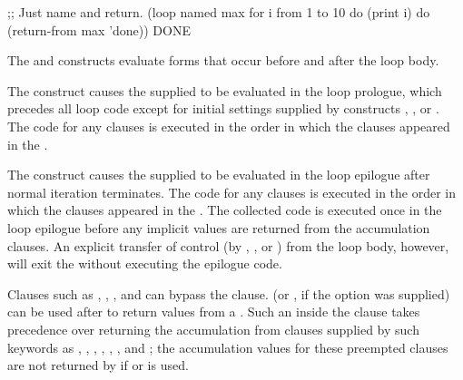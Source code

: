 
\code
;; Just name and return.
 (loop named max
       for i from 1 to 10
       do (print i)
       do (return-from max 'done))
\EV DONE
\endcode

\endsubsubsubsection%

\endsubsubsection%

 
The  and  constructs
evaluate forms that occur before and after the loop body.

The  construct causes the supplied
to be evaluated
in the loop prologue, which precedes all loop code except for 
initial settings supplied by constructs , , or
.
  The code for any  clauses is 
executed
in the order in which the clauses appeared in
  the .  
  
The  construct causes the supplied
to be evaluated
in the loop epilogue after normal iteration terminates.
  The code for any  clauses is 
executed
 in the order in which the clauses appeared in
  the .  The collected code is executed once in the loop epilogue
  before any implicit values are returned from the accumulation clauses.
An explicit transfer of control (\eg by , , or )
from the loop body, however, will exit the 
   without executing the epilogue code.
 
Clauses such as , , , and 
can bypass the  clause.
 (or , if the  option was supplied)
can be used after  to return values from a .  
Such an 
inside the
 clause takes precedence over returning the accumulation
from clauses supplied by such keywords as , , 
, , , , and 
; 
the accumulation values for these preempted clauses are not returned by 
 if  or  is used.
 
